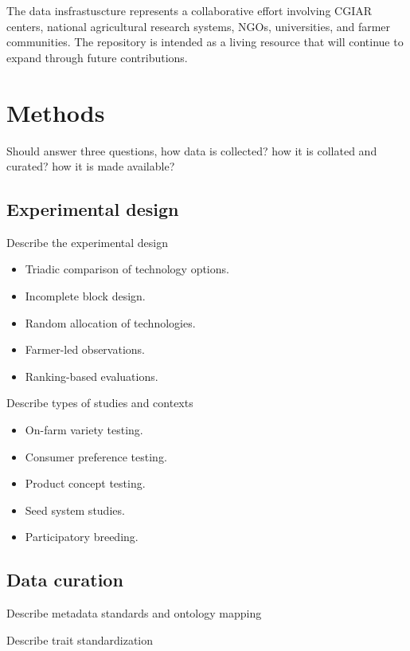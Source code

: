 \documentclass[3p]{elsarticle} %
\providecommand{\tightlist}{%
  \setlength{\itemsep}{0pt}\setlength{\parskip}{0pt}}
\begin{document}
The data insfrastuscture represents a collaborative effort involving
CGIAR centers, national agricultural research systems, NGOs,
universities, and farmer communities. The repository is intended as a
living resource that will continue to expand through future
contributions.

\section{Methods}\label{methods}

Should answer three questions, how data is collected? how it is collated
and curated? how it is made available?

\subsection{Experimental design}\label{experimental-design}

Describe the experimental design

\begin{itemize}
\tightlist
\item
  Triadic comparison of technology options.
\item
  Incomplete block design.
\item
  Random allocation of technologies.
\item
  Farmer-led observations.
\item
  Ranking-based evaluations.
\end{itemize}

Describe types of studies and contexts

\begin{itemize}
\tightlist
\item
  On-farm variety testing.
\item
  Consumer preference testing.
\item
  Product concept testing.
\item
  Seed system studies.
\item
  Participatory breeding.
\end{itemize}

\subsection{Data curation}\label{data-curation}

Describe metadata standards and ontology mapping

Describe trait standardization
\end{document}
